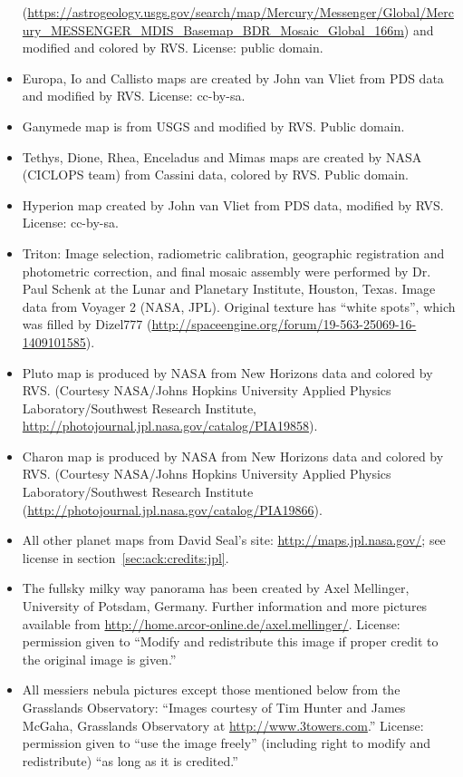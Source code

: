 \begin{itemize}
	  (\url{https://astrogeology.usgs.gov/search/map/Mercury/Messenger/Global/Mercury_MESSENGER_MDIS_Basemap_BDR_Mosaic_Global_166m})
	  and modified and colored by RVS. License: public domain.
\item Europa, Io and Callisto maps are created by John van Vliet from PDS data and modified by RVS. License: cc-by-sa.
\item Ganymede map is from USGS and modified by RVS. Public domain.
\item Tethys, Dione, Rhea, Enceladus and Mimas maps are created by NASA (CICLOPS team) from Cassini data, colored by RVS. Public domain.
\item Hyperion map created by John van Vliet from PDS data, modified by RVS. License: cc-by-sa.
\item Triton: Image selection, radiometric calibration, geographic registration and photometric correction, and final mosaic assembly 
	  were performed by Dr. Paul Schenk at the Lunar and Planetary Institute, Houston, Texas. Image data from Voyager 2 (NASA, JPL).
	  Original texture has ``white spots'', which was filled by Dizel777 (\url{http://spaceengine.org/forum/19-563-25069-16-1409101585}).
\item Pluto map is produced by NASA from New Horizons data and colored by RVS. (Courtesy NASA/Johns Hopkins University Applied Physics
	  Laboratory/Southwest Research Institute, \url{http://photojournal.jpl.nasa.gov/catalog/PIA19858}).
\item Charon map is produced by NASA from New Horizons data and colored by RVS. (Courtesy NASA/Johns Hopkins University Applied Physics
	  Laboratory/Southwest Research Institute (\url{http://photojournal.jpl.nasa.gov/catalog/PIA19866}).
\item All other planet maps from David Seal's site: \url{http://maps.jpl.nasa.gov/}; see license in section~\ref{sec:ack:credits:jpl}.
\item The fullsky milky way panorama has been created by Axel Mellinger, University of Potsdam, Germany. 
      Further information and more pictures available from \url{http://home.arcor-online.de/axel.mellinger/}.
      License: permission given to ``Modify and redistribute this image if proper credit to the original image is given.''
\item All messiers nebula pictures except those mentioned below from the
	  Grasslands Observatory: ``Images courtesy of Tim Hunter and James McGaha, Grasslands Observatory at \url{http://www.3towers.com}.''
	  License: permission given to ``use the image freely'' (including right to modify and redistribute) ``as long as it is credited.''

\end{itemize}
